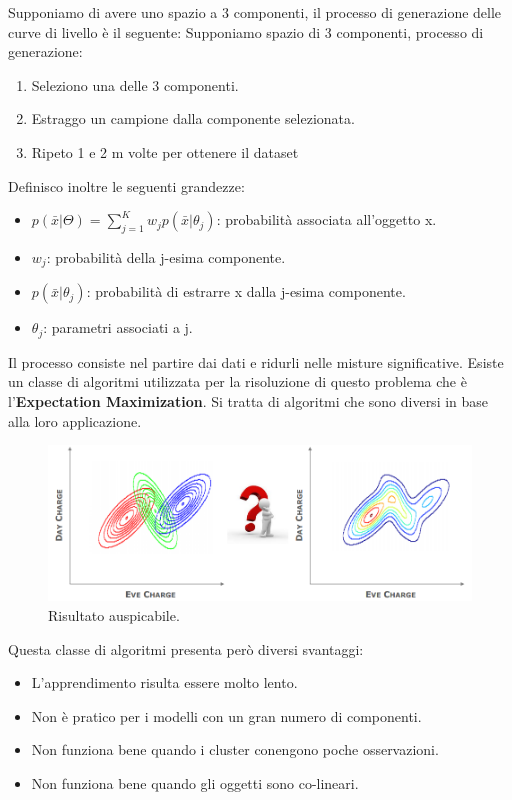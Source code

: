 Supponiamo di avere uno spazio a 3 componenti, il processo di generazione delle curve di livello è il seguente:
Supponiamo spazio di 3 componenti, processo di generazione:
\begin{enumerate}
	\item Seleziono una delle 3 componenti.
	\item Estraggo un campione dalla componente selezionata.
	\item Ripeto 1 e 2 m volte per ottenere il dataset
\end{enumerate} 

Definisco inoltre le seguenti grandezze:



\begin{itemize}
	\item $p(\bar{x}|\Theta) = \sum_{j=1}^{K} w_j p(\bar{x}|\theta_j)$: probabilità associata all'oggetto x.
	\item $w_j$: probabilità della j-esima componente.
	\item $p(\bar{x}|\theta_j)$: probabilità di estrarre x dalla j-esima componente.
	\item $\theta_j$: parametri associati a j.
\end{itemize}

Il processo consiste nel partire dai dati e ridurli nelle misture significative.
Esiste un classe di algoritmi utilizzata per la risoluzione di questo problema che è l'\textbf{Expectation Maximization}. Si tratta di algoritmi che sono diversi in base alla loro applicazione. 

\begin{figure}[H]
	\centering
	\includegraphics[height=0.3 \linewidth]{clustering/pict/expectation_maximization.png}
	\caption{Risultato auspicabile.}
\end{figure}
Questa classe di algoritmi presenta però diversi svantaggi:

\begin{itemize}
	\item L'apprendimento risulta essere molto lento.
	\item Non è pratico per i modelli con un gran numero di componenti.
	\item Non funziona bene quando i cluster conengono  poche osservazioni.
	\item Non funziona bene quando gli oggetti sono co-lineari.
\end{itemize}


